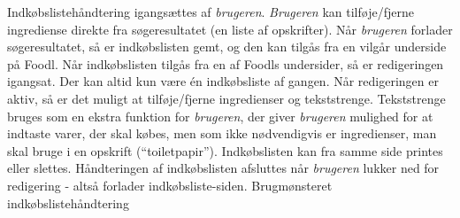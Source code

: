 {Indkøbslistehåndtering igangsættes af \textit{brugeren}. \textit{Brugeren} kan tilføje/fjerne ingrediense direkte fra søgeresultatet (en liste af opskrifter). Når \textit{brugeren} forlader søgeresultatet, så er indkøbslisten gemt, og den kan tilgås fra en vilgår underside på Foodl. Når indkøbslisten tilgås fra en af Foodls undersider, så er redigeringen igangsat. Der kan altid kun være én indkøbsliste af gangen. Når redigeringen er aktiv, så er det muligt at tilføje/fjerne ingredienser og tekststrenge. Tekststrenge bruges som en ekstra funktion for \textit{brugeren}, der giver \textit{brugeren} mulighed for at indtaste varer, der skal købes, men som ikke nødvendigvis er ingredienser, man skal bruge i en opskrift (\fx “toiletpapir”). Indkøbslisten kan fra samme side printes eller slettes. Håndteringen af indkøbslisten afsluttes når \textit{brugeren} lukker ned for redigering - altså forlader indkøbsliste-siden.}
{}
{}
{Brugmønsteret indkøbslistehåndtering}